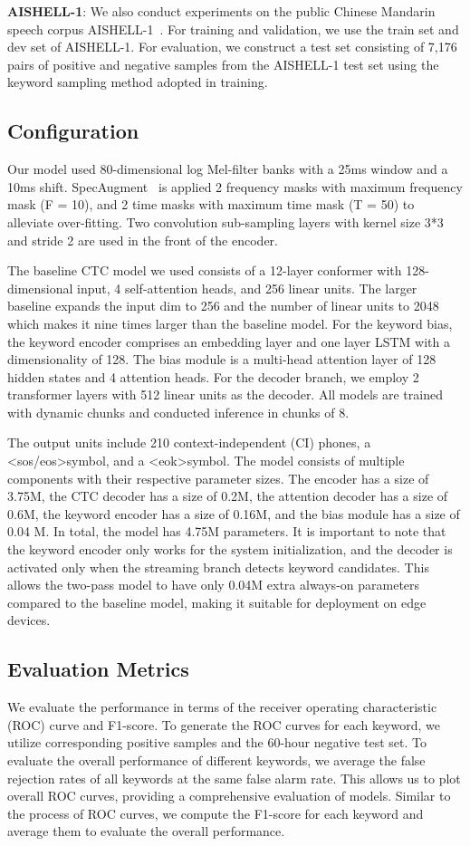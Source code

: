 \documentclass{article}
\begin{document}
\textbf{AISHELL-1}: We also conduct experiments on the public Chinese Mandarin speech corpus AISHELL-1~\cite{aishell1}. For training and validation, we use the train set and dev set of AISHELL-1. For evaluation, we construct a test set consisting of 7,176 pairs of positive and negative samples from the AISHELL-1 test set using the keyword sampling method adopted in training.
\subsection{Configuration}
Our model used 80-dimensional log Mel-filter banks with a 25ms window and a 10ms shift. SpecAugment~\cite{specaug} is applied 2 frequency masks with maximum frequency mask (F = 10), and 2 time masks with maximum time mask (T = 50) to alleviate over-fitting. Two convolution sub-sampling layers with kernel size 3*3 and stride 2 are used in the front of the encoder. 

The baseline CTC model we used consists of a 12-layer conformer with 128-dimensional input, 4 self-attention heads, and 256 linear units. The larger baseline expands the input dim to 256 and the number of linear units to 2048 which makes it nine times larger than the baseline model. For the keyword bias, the keyword encoder comprises an embedding layer and one layer LSTM with a dimensionality of 128. The bias module is a multi-head attention layer of 128 hidden states and 4 attention heads. For the decoder branch, we employ 2 transformer layers with 512 linear units as the decoder. All models are trained with dynamic chunks and conducted inference in chunks of 8. 

The output units include 210 context-independent (CI) phones, a \textless sos/eos\textgreater symbol, and a \textless eok\textgreater symbol.
The model consists of multiple components with their respective parameter sizes. The encoder has a size of 3.75M, the CTC decoder has a size of 0.2M, the attention decoder has a size of 0.6M, the keyword encoder has a size of 0.16M, and the bias module has a size of 0.04 M. In total, the model has 4.75M parameters. 
It is important to note that the keyword encoder only works for the system initialization, and the decoder is activated only when the streaming branch detects keyword candidates. This allows the two-pass model to have only 0.04M extra always-on parameters compared to the baseline model, making it suitable for deployment on edge devices.
\subsection{Evaluation Metrics}
We evaluate the performance in terms of the receiver operating characteristic (ROC) curve and F1-score. To generate the ROC curves for each keyword, we utilize corresponding positive samples and the 60-hour negative test set. To evaluate the overall performance of different keywords, we average the false rejection rates of all keywords at the same false alarm rate. This allows us to plot overall ROC curves, providing a comprehensive evaluation of models.
Similar to the process of ROC curves, we compute the F1-score for each keyword and average them to evaluate the overall performance.
\end{document}
